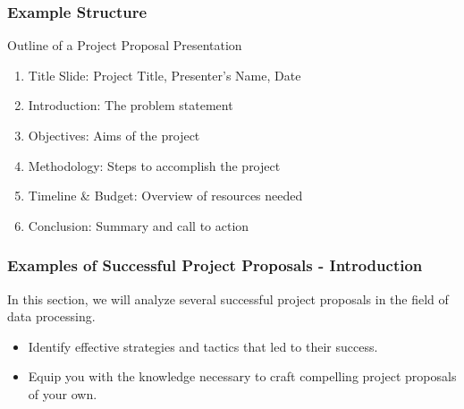 \documentclass[aspectratio=169]{beamer}
\begin{document}
\begin{frame}[fragile]
    \frametitle{Example Structure}
    \begin{block}{Outline of a Project Proposal Presentation}
        \begin{enumerate}
            \item Title Slide: Project Title, Presenter’s Name, Date
            \item Introduction: The problem statement
            \item Objectives: Aims of the project
            \item Methodology: Steps to accomplish the project
            \item Timeline \& Budget: Overview of resources needed
            \item Conclusion: Summary and call to action
        \end{enumerate}
    \end{block}
\end{frame}

\begin{frame}[fragile]
    \frametitle{Examples of Successful Project Proposals - Introduction}
    In this section, we will analyze several successful project proposals in the field of data processing. 
    \begin{itemize}
        \item Identify effective strategies and tactics that led to their success.
        \item Equip you with the knowledge necessary to craft compelling project proposals of your own.
    \end{itemize}
\end{frame}
\end{document}

